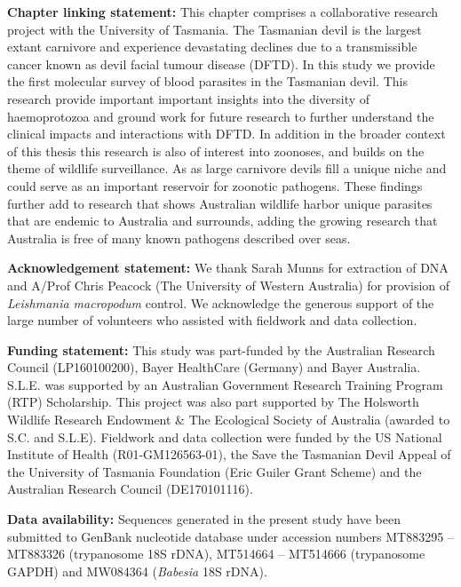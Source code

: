 \documentclass[a4paper, nobind]{templates/ociamthesis}
\begin{document}
\newpage

\textbf{Chapter linking statement:}
This chapter comprises a collaborative research project with the University of Tasmania. The Tasmanian devil is the largest extant carnivore and experience devastating declines due to a transmissible cancer known as devil facial tumour disease (DFTD). In this study we provide the first molecular survey of blood parasites in the Tasmanian devil. This research provide important important insights into the diversity of haemoprotozoa and ground work for future research to further understand the clinical impacts and interactions with DFTD. In addition in the broader context of this thesis this research is also of interest into zoonoses, and builds on the theme of wildlife surveillance. As as large carnivore devils fill a unique niche and could serve as an important reservoir for zoonotic pathogens. These findings further add to research that shows Australian wildlife harbor unique parasites that are endemic to Australia and surrounds, adding the growing research that Australia is free of many known pathogens described over seas.

\vspace{5mm}

\textbf{Acknowledgement statement:}
We thank Sarah Munns for extraction of DNA and A/Prof Chris Peacock (The University of Western Australia) for provision of \emph{Leishmania macropodum} control. We acknowledge the generous support of the large number of volunteers who assisted with fieldwork and data collection.

\vspace{5mm}

\textbf{Funding statement:} This study was part-funded by the Australian Research Council (LP160100200), Bayer HealthCare (Germany) and Bayer Australia. S.L.E. was supported by an Australian Government Research Training Program (RTP) Scholarship. This project was also part supported by The Holsworth Wildlife Research Endowment \& The Ecological Society of Australia (awarded to S.C. and S.L.E). Fieldwork and data collection were funded by the US National Institute of Health (R01-GM126563-01), the Save the Tasmanian Devil Appeal of the University of Tasmania Foundation (Eric Guiler Grant Scheme) and the Australian Research Council (DE170101116).

\vspace{5mm}

\textbf{Data availability:} Sequences generated in the present study have been submitted to GenBank nucleotide database under accession numbers MT883295 -- MT883326 (trypanosome 18S rDNA), MT514664 -- MT514666 (trypanosome GAPDH) and MW084364 (\emph{Babesia} 18S rDNA).
\end{document}
